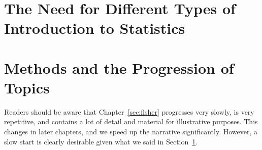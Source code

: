 \addchap{\lsPrefaceTitle}

\section{The Need for Different Types of Introduction to Statistics}\label{sec:need}

\section{Methods and the Progression of Topics}

Readers should be aware that Chapter~\ref{sec:fisher} progresses very slowly, is very repetitive, and contains a lot of detail and material for illustrative purposes.
This changes in later chapters, and we speed up the narrative significantly.
However, a slow start is clearly desirable given what we said in Section~\ref{sec:need}.
